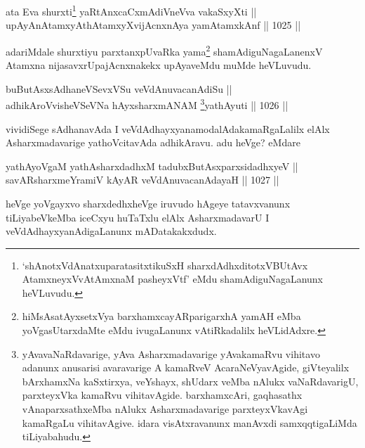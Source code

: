 \begin{shl}
ata Eva shurxti\footnote{`shAnotxVdAnatxuparatasitxtikuSxH sharxdAdhxditotxVBUtAvx AtamxneyxVvA\s \s tAmxnaM pasheyxVtf' eMdu shamAdiguNagaLanunx heVLuvudu.} yaRtAnxcaCxmAdiVneVva vakaSxyXti || \\
upAyAnAtamxyAthAtamxyXvijAcnxnAya yamAtamxkAnf \hfill || 1025 ||  
\end{shl}

\begin{artha}
adariMdale shurxtiyu parxtanxpUvaRka yama\footnote{hiMsAsatAyxsetxVya barxhamxcayAR\s parigarxhA yamAH eMba yoVgasUtarxdaMte eMdu ivugaLanunx vAtiRkadalilx heVLidAdxre.} shamAdiguNagaLanenxV Atamxna nijasavxrUpajAcnxnakekx upAyaveMdu muMde heVLuvudu.
\end{artha}


\begin{shl}
buButAsxsAdhaneVSevxVSu veVdAnuvacanAdiSu || \\
adhikAroV\s visheVSeVNa hAyxsharxmANAM \footnote{yAvavaNaRdavarige, yAva Asharxmadavarige yAvakamaRvu vihitavo adanunx anusarisi avaravarige A kamaRveV AcaraNeVyavAgide, giVteyalilx bArxhamxNa kaSxtirxya, veYshayx, shUdarx veMba nAlukx vaNaRdavarigU, parxteyxVka kamaRvu vihitavAgide. barxhamxcAri, gaqhasathx vAnaparxsathx\ndash eMba nAlukx Asharxmadavarige parxteyxVkavAgi kamaRgaLu vihitavAgive. idara visAtxravanunx manAvxdi samxqqtigaLiMda tiLiyabahudu.}yathAyuti \hfill || 1026 ||  
\end{shl}


\begin{artha}
vividiSege sAdhanavAda I veVdAdhayxyanamodalAdakamaRgaLalilx elAlx Asharxmadavarige yathoVcitavAda adhikAravu. adu heVge? eMdare
\end{artha}

\begin{shl}
yathAyoVgaM yathAsharxdadhxM tadubxButAsxparxsidadhxyeV || \\
savARsharxmeYramiV kAyAR veVdAnuvacanAdayaH \hfill || 1027 ||  
\end{shl}

\begin{artha}
heVge yoVgayxvo sharxdedhxheVge iruvudo hAgeye tatavxvanunx tiLiyabeVkeMba iceCxyu huTaTxlu elAlx AsharxmadavarU I veVdAdhayxyanAdigaLanunx mADatakakxdudx.
\end{artha}


